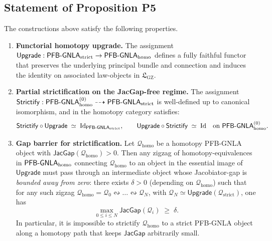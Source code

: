 \documentclass[11pt]{book}
\theoremstyle{plain}
\theoremstyle{definition}
\newcommand{\GZLS}{\ensuremath{\mathfrak{L}_{\mathrm{GZ}}}}       \newcommand{\GZLT}{\ensuremath{M_{!w}}}                           \newcommand{\GZLOC}{\ensuremath{A_M}}                             \newcommand{\GZLCurv}{\ensuremath{\mathcal{F}_{\mathrm{law}}}}
\begin{document}
\subsection*{Statement of Proposition P5}


\begin{proposition}
\label{prop:P5-upgrade-strictify}
The constructions above satisfy the following properties.

\begin{enumerate}
  \item[\textnormal{(1)}] \textbf{Functorial homotopy upgrade.}
    The assignment 
    \(\mathsf{Upgrade} : \\
      \mathsf{PFB\text- GNLA}_{\mathrm{strict}}
      \to \mathsf{PFB\text- GNLA}_{\mathrm{homo}}\)
    defines a fully faithful functor that preserves the underlying
    principal bundle and connection and induces the identity on
    associated law-objects in \(\GZLS\).
  \item[\textnormal{(2)}] \textbf{Partial strictification on the
        JacGap-free regime.}
    The assignment
    \(\mathsf{Strictify} :
      \mathsf{PFB\text- GNLA}_{\mathrm{homo}}^{(0)}
      \dashrightarrow
      \mathsf{PFB\text- GNLA}_{\mathrm{strict}}\)
    is well-defined up to canonical isomorphism, and in the homotopy
    category satisfies:
    \[
      \mathsf{Strictify}\circ\mathsf{Upgrade}
      \;\simeq\;
      \mathrm{Id}_{\mathsf{PFB\text- GNLA}_{\mathrm{strict}}},
      \qquad
      \mathsf{Upgrade}\circ\mathsf{Strictify}
      \;\simeq\;
      \mathrm{Id}\quad
      \text{on }\mathsf{PFB\text- GNLA}_{\mathrm{homo}}^{(0)}.
    \]
  \item[\textnormal{(3)}] \textbf{Gap barrier for strictification.}
    Let \(\mathcal{Q}_{\mathrm{homo}}\) be a homotopy PFB-GNLA object
    with \(\mathsf{JacGap}(\mathcal{Q}_{\mathrm{homo}})>0\).  Then any
    zigzag of homotopy-equivalences in
    \(\mathsf{PFB\text- GNLA}_{\mathrm{homo}}\) connecting
    \(\mathcal{Q}_{\mathrm{homo}}\) to an object in the essential
    image of \(\mathsf{Upgrade}\) must pass through an intermediate
    object whose Jacobiator-gap is \emph{bounded away from zero}:
    there exists \(\delta>0\) (depending on
    \(\mathcal{Q}_{\mathrm{homo}}\)) such that for any such zigzag
    \(\mathcal{Q}_{\mathrm{homo}}=\mathcal{Q}_0
      \leftrightsquigarrow \dots
      \leftrightsquigarrow\mathcal{Q}_N\),
    with \(\mathcal{Q}_N\simeq \mathsf{Upgrade}(\mathcal{Q}_{\mathrm{strict}})\),
    one has
    \[
      \max_{0\le i\le N}
      \mathsf{JacGap}(\mathcal{Q}_i)
      \;\ge\;
      \delta.
    \]
    In particular, it is impossible to strictify
    \(\mathcal{Q}_{\mathrm{homo}}\) to a strict PFB-GNLA object along
    a homotopy path that keeps \(\mathsf{JacGap}\) arbitrarily small.
\end{enumerate}
\end{proposition}
\end{document}
